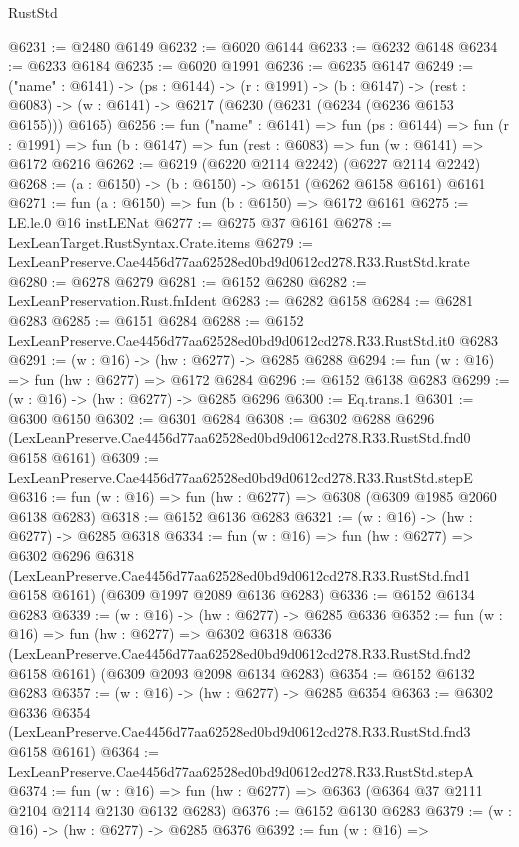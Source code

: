 \begin{lexlean}{RustStd}
\begin{coremodule}
@6231 := @2480 @6149
@6232 := @6020 @6144
@6233 := @6232 @6148
@6234 := @6233 @6184
@6235 := @6020 @1991
@6236 := @6235 @6147
@6249 := ("name" : @6141) ->
  (ps : @6144) ->
  (r : @1991) ->
  (b : @6147) ->
  (rest : @6083) -> (w : @6141) -> @6217 (@6230 (@6231 (@6234 (@6236 @6153 @6155))) @6165)
@6256 := fun ("name" : @6141) =>
  fun (ps : @6144) =>
  fun (r : @1991) => fun (b : @6147) => fun (rest : @6083) => fun (w : @6141) => @6172 @6216
@6262 := @6219 (@6220 @2114 @2242) (@6227 @2114 @2242)
@6268 := (a : @6150) -> (b : @6150) -> @6151 (@6262 @6158 @6161) @6161
@6271 := fun (a : @6150) => fun (b : @6150) => @6172 @6161
@6275 := LE.le.{0} @16 instLENat
@6277 := @6275 @37 @6161
@6278 := LexLeanTarget.RustSyntax.Crate.items
@6279 := LexLeanPreserve.Cae4456d77aa62528ed0bd9d0612cd278.R33.RustStd.krate
@6280 := @6278 @6279
@6281 := @6152 @6280
@6282 := LexLeanPreservation.Rust.fnIdent
@6283 := @6282 @6158
@6284 := @6281 @6283
@6285 := @6151 @6284
@6288 := @6152 LexLeanPreserve.Cae4456d77aa62528ed0bd9d0612cd278.R33.RustStd.it0 @6283
@6291 := (w : @16) -> (hw : @6277) -> @6285 @6288
@6294 := fun (w : @16) => fun (hw : @6277) => @6172 @6284
@6296 := @6152 @6138 @6283
@6299 := (w : @16) -> (hw : @6277) -> @6285 @6296
@6300 := Eq.trans.{1}
@6301 := @6300 @6150
@6302 := @6301 @6284
@6308 := @6302
    @6288
    @6296
    (LexLeanPreserve.Cae4456d77aa62528ed0bd9d0612cd278.R33.RustStd.fnd0 @6158 @6161)
@6309 := LexLeanPreserve.Cae4456d77aa62528ed0bd9d0612cd278.R33.RustStd.stepE
@6316 := fun (w : @16) => fun (hw : @6277) => @6308 (@6309 @1985 @2060 @6138 @6283)
@6318 := @6152 @6136 @6283
@6321 := (w : @16) -> (hw : @6277) -> @6285 @6318
@6334 := fun (w : @16) =>
  fun (hw : @6277) =>
  @6302
    @6296
    @6318
    (LexLeanPreserve.Cae4456d77aa62528ed0bd9d0612cd278.R33.RustStd.fnd1 @6158 @6161)
    (@6309 @1997 @2089 @6136 @6283)
@6336 := @6152 @6134 @6283
@6339 := (w : @16) -> (hw : @6277) -> @6285 @6336
@6352 := fun (w : @16) =>
  fun (hw : @6277) =>
  @6302
    @6318
    @6336
    (LexLeanPreserve.Cae4456d77aa62528ed0bd9d0612cd278.R33.RustStd.fnd2 @6158 @6161)
    (@6309 @2093 @2098 @6134 @6283)
@6354 := @6152 @6132 @6283
@6357 := (w : @16) -> (hw : @6277) -> @6285 @6354
@6363 := @6302
    @6336
    @6354
    (LexLeanPreserve.Cae4456d77aa62528ed0bd9d0612cd278.R33.RustStd.fnd3 @6158 @6161)
@6364 := LexLeanPreserve.Cae4456d77aa62528ed0bd9d0612cd278.R33.RustStd.stepA
@6374 := fun (w : @16) => fun (hw : @6277) => @6363 (@6364 @37 @2111 @2104 @2114 @2130 @6132 @6283)
@6376 := @6152 @6130 @6283
@6379 := (w : @16) -> (hw : @6277) -> @6285 @6376
@6392 := fun (w : @16) =>

\end{coremodule}
\end{lexlean}
